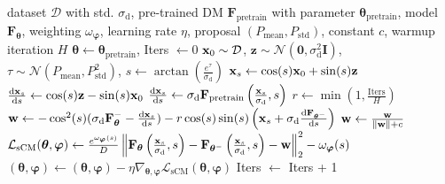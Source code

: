 \begin{algorithm}[tb]
{\small
\caption{Training of Continuous-time Consistency Models (sCM) \label{alg:scm}}
\begin{algorithmic}[1]
\Require dataset $\mathcal{D}$ with std. $\sigma_{\mathrm{d}}$, pre-trained DM $\mathbf{F}_{\text{pretrain}}$ with parameter $\bm{\theta}_{\text{pretrain}}$, model $\mathbf{F}_{\bm{\theta}}$, weighting $\omega_{\boldsymbol{\varphi}}$, learning rate $\eta$, proposal $(P_{\text{mean}}, P_{\text{std}})$, constant $c$, warmup iteration $H$
\State {} $\bm{\theta} \gets \bm{\theta}_{\text{pretrain}}$, Iters $\gets 0$
\Repeat
    \State ${\mathbf{x}}_0 \sim \mathcal{D}$, $\mathbf{z} \sim \mathcal{N}(\bm{0}, \sigma_{\mathrm{d}}^2 \mathbf{I})$, $\tau \sim \mathcal{N}(P_{\text{mean}}, P_{\text{std}}^2)$, $s \gets \arctan\left(\frac{e^\tau}{\sigma_{\mathrm{d}}}\right)$
    \State ${\mathbf{x}}_s \gets \cos(s) {\mathbf{x}}_0 + \sin(s) \mathbf{z}$
        \State $\frac{\mathop{}\!\mathrm{d}{\mathbf{x}}_s}{\mathop{}\!\mathrm{d} s} \gets \cos(s) \mathbf{z} - \sin(s) {\mathbf{x}}_0$
    \Else
        \State $\frac{\mathop{}\!\mathrm{d}{\mathbf{x}}_s}{\mathop{}\!\mathrm{d} s} \gets \sigma_{\mathrm{d}} \mathbf{F}_{\text{pretrain}}\left(\frac{{\mathbf{x}}_s}{\sigma_{\mathrm{d}}}, s\right)$
    \EndIf
    \State $r \gets \min\left(1, \frac{\text{Iters}}{H}\right)$ \hfill {}
    \State ${\mathbf{w}} \gets - \cos^2(s) (\sigma_{\mathrm{d}} \mathbf{F}_{\bm{\theta}}^{-} - \frac{\mathop{}\!\mathrm{d}{\mathbf{x}}_s}{\mathop{}\!\mathrm{d} s}) - r  \cos(s) \sin(s) \left({\mathbf{x}}_s + \sigma_{\mathrm{d}} \frac{\mathop{}\!\mathrm{d}\mathbf{F}_{\bm{\theta}^-}}{\mathop{}\!\mathrm{d} s}\right)$
    \State ${\mathbf{w}} \gets \frac{{\mathbf{w}}}{\|{\mathbf{w}}\| + c}$ \hfill {}
    \State $\mathcal{L}_{\text{sCM}}(\bm{\theta}, \boldsymbol{\varphi}) \gets\frac{e^{\omega_{\boldsymbol{\varphi}}(s)}}{D} \left\lVert \mathbf{F}_{\bm{\theta}}\left( \frac{{\mathbf{x}}_s}{\sigma_{\mathrm{d}}}, s\right) - \mathbf{F}_{\bm{\theta}^{-}}\left( \frac{{\mathbf{x}}_s}{\sigma_{\mathrm{d}}}, s\right) - {\mathbf{w}} \right\rVert^2_2 - \omega_{\boldsymbol{\varphi}}(s)$
    \Statex  \hfill {}
    \State $(\bm{\theta}, \boldsymbol{\varphi}) \gets (\bm{\theta}, \boldsymbol{\varphi}) - \eta \nabla_{\bm{\theta}, \boldsymbol{\varphi}} \mathcal{L}_{\text{sCM}}(\bm{\theta}, \boldsymbol{\varphi})$
    \State Iters $\gets$ Iters + 1
\end{algorithmic}
}
\end{algorithm}








